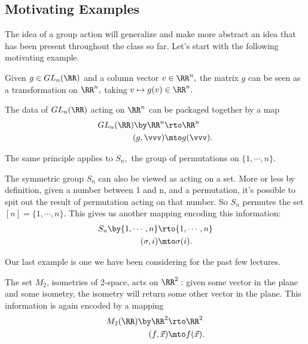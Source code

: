 \subsection{Motivating Examples}
The idea of a group action will generalize and make more abstract an idea that has been present throughout the class so far. Let's start with the following motivating example. 
\begin{example}[$GL_n$]
Given $g \in GL_n(\RR)$ and a column vector $v \in \RR^n,$ the matrix $g$ can be seen as a transformation on $\RR^n,$ taking $v \mapsto g(v) \in \RR^n.$ 

The data of $GL_n(\RR)$ acting on $\RR^n$ can be packaged together by a map 
\begin{align*}
    GL_n(\RR) \by \RR^n &\rto \RR^n \\
    (g, \vvv) &\mto g(\vvv).
\end{align*}
\end{example}

The same principle applies to $S_n,$ the group of permutations on $\{1, \cdots, n\}$.
\begin{example}[$S_n$]
The symmetric group $S_n$ can also be viewed as acting on a set. More or less by definition, given a number between 1 and n, and a permutation, it's possible to spit out the result of permutation acting on that number. So $S_n$ permutes the set $[n] = \{1, \cdots, n\}.$
This gives us another mapping encoding this information:
\begin{align*}
    S_n \by \{1, \cdots, n\} &\rto \{1, \cdots, n\} \\
    (\sigma, i) &\mto \sigma(i).
\end{align*} 
\end{example}

Our last example is one we have been considering for the past few lectures.
\begin{example}
The set $M_2$, isometries of 2-space, acts on $\RR^2:$ given some vector in the plane and some isometry, the isometry will return some other vector in the plane. This information is again encoded by a mapping
\begin{align*}
    M_2(\RR) \by \RR^2 &\rto \RR^2 \\
    (f, \vec{x}) &\mto f(\vec{x}). 
\end{align*}
\end{example}

